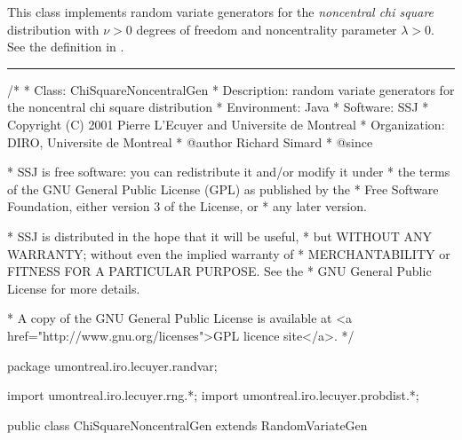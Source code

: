 
This class implements random variate generators for the
{\em noncentral chi square\/} distribution with $\nu > 0$ degrees of freedom
and noncentrality parameter $\lambda > 0$. See the definition in
 .

\bigskip\hrule

\begin{code}
\begin{hide}
/*
 * Class:        ChiSquareNoncentralGen
 * Description:  random variate generators for the noncentral chi square distribution
 * Environment:  Java
 * Software:     SSJ
 * Copyright (C) 2001  Pierre L'Ecuyer and Universite de Montreal
 * Organization: DIRO, Universite de Montreal
 * @author       Richard Simard
 * @since

 * SSJ is free software: you can redistribute it and/or modify it under
 * the terms of the GNU General Public License (GPL) as published by the
 * Free Software Foundation, either version 3 of the License, or
 * any later version.

 * SSJ is distributed in the hope that it will be useful,
 * but WITHOUT ANY WARRANTY; without even the implied warranty of
 * MERCHANTABILITY or FITNESS FOR A PARTICULAR PURPOSE.  See the
 * GNU General Public License for more details.

 * A copy of the GNU General Public License is available at
   <a href="http://www.gnu.org/licenses">GPL licence site</a>.
 */
\end{hide}
package umontreal.iro.lecuyer.randvar;\begin{hide}
import umontreal.iro.lecuyer.rng.*;
import umontreal.iro.lecuyer.probdist.*;
\end{hide}

public class ChiSquareNoncentralGen extends RandomVariateGen \begin{hide} {
   protected double nu = -1.0;
   protected double lambda = -1.0;

\end{hide}
\end{code}

